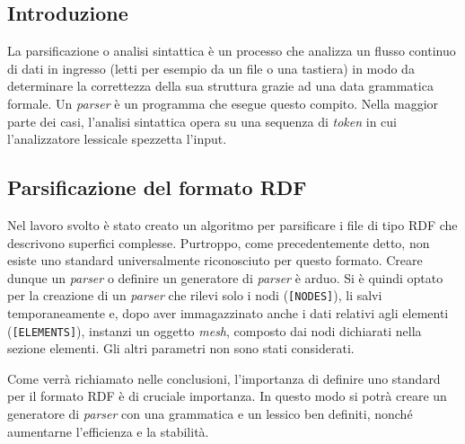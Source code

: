 \subsection{Introduzione}
La parsificazione o analisi sintattica è un processo che analizza un flusso continuo di dati in ingresso (letti per esempio da un file o una tastiera) in modo da determinare la correttezza della sua struttura grazie ad una data grammatica formale. Un \textit{parser} è un programma che esegue questo compito. Nella maggior parte dei casi, l'analisi sintattica opera su una sequenza di \textit{token} in cui l'analizzatore lessicale spezzetta l'input.
%
\subsection{Parsificazione del formato RDF}
Nel lavoro svolto è stato creato un algoritmo per parsificare i file di tipo \ac{RDF} che descrivono superfici complesse. Purtroppo, come precedentemente detto, non esiste uno standard universalmente riconosciuto per questo formato. Creare dunque un \textit{parser} o definire un generatore di \textit{parser} è arduo. Si è quindi optato per la creazione di un \textit{parser} che rilevi solo i nodi (\texttt{[NODES]}), li salvi temporaneamente e, dopo aver immagazzinato anche i dati relativi agli elementi (\texttt{[ELEMENTS]}), instanzi un oggetto \textit{mesh}, composto dai nodi dichiarati nella sezione elementi. Gli altri parametri non sono stati considerati.

Come verrà richiamato nelle conclusioni, l'importanza di definire uno standard per il formato \ac{RDF} è di cruciale importanza. In questo modo si potrà creare un generatore di \textit{parser} con una grammatica e un lessico ben definiti, nonché aumentarne l'efficienza e la stabilità.
%
